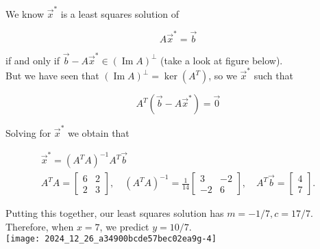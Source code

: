 \documentclass[10pt]{article}
\begin{document}
We know $\vec{x}^{*}$ is a least squares solution of

$$
A \vec{x}^{*}=\vec{b}
$$

if and only if $\vec{b}-A \vec{x}^{*} \in(\operatorname{Im} A)^{\perp}$ (take a look at figure below).\\
But we have seen that $(\operatorname{Im} A)^{\perp}=\operatorname{ker}\left(A^{T}\right)$, so we $\vec{x}^{*}$ such that

$$
A^{T}\left(\vec{b}-A \vec{x}^{*}\right)=\overrightarrow{0}
$$

Solving for $\vec{x}^{*}$ we obtain that

$$
\begin{gathered}
\vec{x}^{*}=\left(A^{T} A\right)^{-1} A^{T} \vec{b} \\
A^{T} A=\left[\begin{array}{ll}
6 & 2 \\
2 & 3
\end{array}\right], \quad\left(A^{T} A\right)^{-1}=\frac{1}{14}\left[\begin{array}{cc}
3 & -2 \\
-2 & 6
\end{array}\right], \quad A^{T} \vec{b}=\left[\begin{array}{l}
4 \\
7
\end{array}\right] .
\end{gathered}
$$

Putting this together, our least squares solution has $m=-1 / 7, c=17 / 7$. Therefore, when $x=7$, we predict $y=10 / 7$.\\
\texttt{[image: 2024\_12\_26\_a34900bcde57bec02ea9g-4]}
\end{document}
